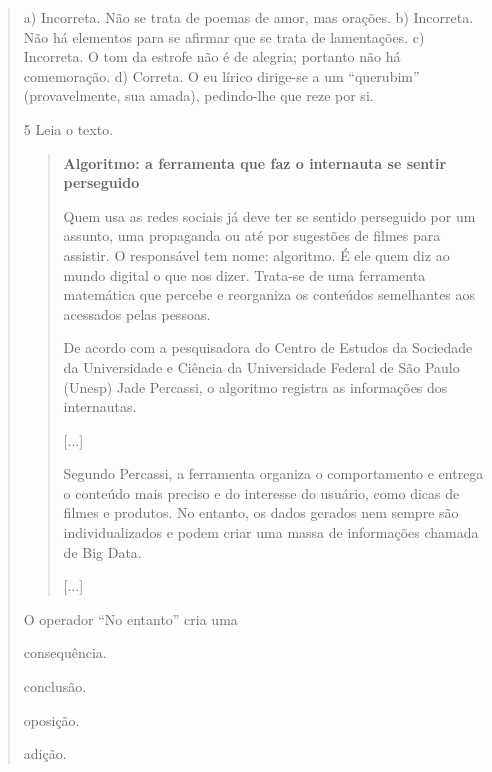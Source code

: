 \begin{quote}
{a) Incorreta. Não se trata de poemas de amor, mas orações.
b) Incorreta. Não há elementos para se afirmar que se trata de lamentações.
c) Incorreta. O tom da estrofe não é de alegria; portanto não há comemoração.
d) Correta. O eu lírico dirige-se a um “querubim” (provavelmente, sua amada), pedindo-lhe que reze por si.}

\num{5} Leia o texto.

\begin{quote}
\textbf{Algoritmo: a ferramenta que faz o internauta se sentir perseguido}

Quem usa as redes sociais já deve ter se sentido perseguido por um assunto, uma propaganda ou até por sugestões de filmes para assistir. O responsável tem nome: algoritmo. É ele quem diz ao mundo digital o que nos dizer. Trata-se de uma ferramenta matemática que percebe e reorganiza os conteúdos semelhantes aos acessados pelas pessoas.

De acordo com a pesquisadora do Centro de Estudos da Sociedade da Universidade e Ciência da Universidade Federal de São Paulo (Unesp) Jade Percassi, o algoritmo registra as informações dos internautas.

{[}...{]}

Segundo Percassi, a ferramenta organiza o comportamento e entrega o conteúdo mais preciso e do interesse do usuário, como dicas de filmes e produtos. No entanto, os dados gerados nem sempre são individualizados e podem criar uma massa de informações chamada de Big Data.

{[}...{]}

\end{quote}

O operador “No entanto” cria uma

\begin{escolha}
\item consequência.

\item conclusão.

\item oposição.

\item adição.
\end{escolha}

\end{quote}
